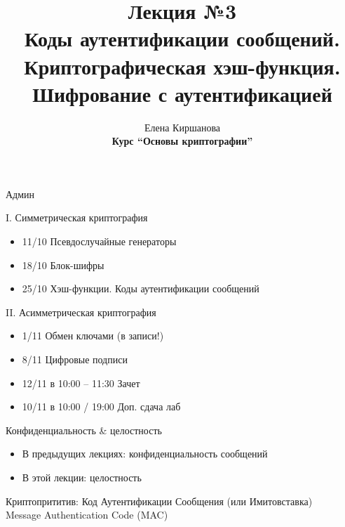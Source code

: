\documentclass[usenames,dvipsnames,8pt,aspectratio=169]{beamer}
\title{Лекция №3 \\[10pt]
	Коды аутентификации сообщений. \\[5pt]
	Криптографическая хэш-функция. \\[5pt] 
	Шифрование с аутентификацией}
\date{ Елена Киршанова \\  \textbf{Курс ``Основы криптографии''} \\  }
\begin{document}
	
\begin{frame}
	\titlepage
\end{frame}

\begin{frame}{Админ}
	
	\Large
	{\color{Orange} I. Симметрическая криптография} \\[10pt]
	\begin{itemize}
		\item 11/10 Псевдослучайные генераторы
		\item 18/10 Блок-шифры
		\item 25/10 Хэш-функции. Коды аутентификации сообщений 
	\end{itemize}
	
	\vspace{20pt}
	{\color{Orange} II. Асимметрическая криптография}
	
	\begin{itemize}
		\item 1/11 Обмен ключами (в записи!)
		\item 8/11 Цифровые подписи
	\end{itemize}
	
	\begin{itemize}
		\item {\color{Orange}12/11 в  10:00 -- 11:30 } Зачет
		\item {\color{Orange}10/11 в  10:00 / 19:00 } Доп. сдача лаб
	\end{itemize}
	
	
\end{frame}


\begin{frame}{Конфиденциальность \& целостность}
\LARGE 

\begin{itemize}
	\itemsep 1em
	\item В предыдущих лекциях: {\color{Orange} конфиденциальность} сообщений
	\item В этой лекции:  {\color{Orange} целостность}
\end{itemize}

\vspace{20pt}
\LARGE {\color{Orange}Криптопрититив}: Код Аутентификации Сообщения (или Имитовставка)  \\[5pt] 
Message Authentication Code (MAC) 


\end{frame}
\end{document}
